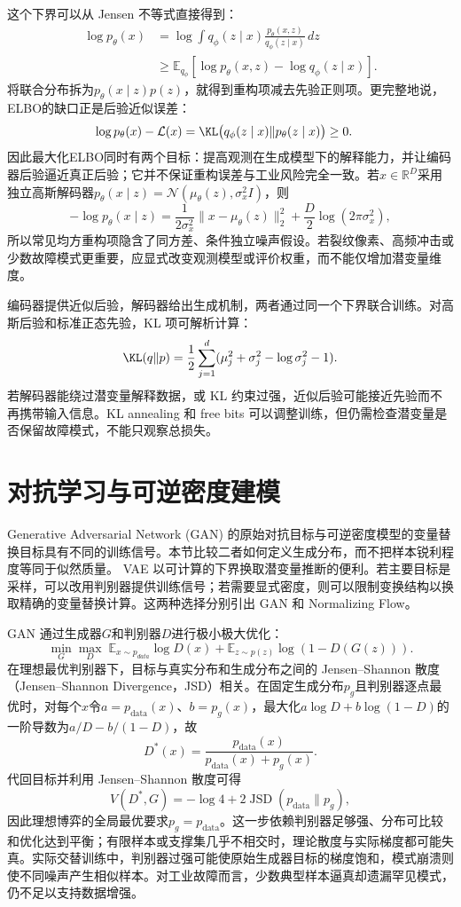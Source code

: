 这个下界可以从 Jensen 不等式直接得到：
\begin{align}
 \log p_\theta(x)
 &=\log\int q_\phi(z\mid x)\frac{p_\theta(x,z)}{q_\phi(z\mid x)}\,dz\\
 &\geq\mathbb E_{q_\phi}[\log p_\theta(x,z)-\log q_\phi(z\mid x)].
\end{align}
将联合分布拆为$p_\theta(x\mid z)p(z)$，就得到重构项减去先验正则项。更完整地说，ELBO的缺口正是后验近似误差：
\begin{align}
\log p_\theta(x)-\mathcal L(x)
&=\KL\bigl(q_\phi(z\mid x)\|p_\theta(z\mid x)\bigr)\geq0.
\end{align}
因此最大化ELBO同时有两个目标：提高观测在生成模型下的解释能力，并让编码器后验逼近真正后验；它并不保证重构误差与工业风险完全一致。若$x\in\mathbb R^D$采用独立高斯解码器$p_\theta(x\mid z)=\mathcal N(\mu_\theta(z),\sigma_x^2I)$，则
\[
-\log p_\theta(x\mid z)=\frac{1}{2\sigma_x^2}\|x-\mu_\theta(z)\|_2^2+\frac D2\log(2\pi\sigma_x^2),
\]
所以常见均方重构项隐含了同方差、条件独立噪声假设。若裂纹像素、高频冲击或少数故障模式更重要，应显式改变观测模型或评价权重，而不能仅增加潜变量维度。

编码器提供近似后验，解码器给出生成机制，两者通过同一个下界联合训练。对高斯后验和标准正态先验，KL 项可解析计算：
\begin{equation}
 \KL(q\|p)=\frac12\sum_{j=1}^{d}(\mu_j^2+\sigma_j^2-\log\sigma_j^2-1).
\end{equation}
若解码器能绕过潜变量解释数据，或 KL 约束过强，近似后验可能接近先验而不再携带输入信息。KL annealing 和 free bits 可以调整训练，但仍需检查潜变量是否保留故障模式，不能只观察总损失。

\section{对抗学习与可逆密度建模}
Generative Adversarial Network (GAN) 的原始对抗目标与可逆密度模型的变量替换目标具有不同的训练信号\cite{goodfellow2014gan,dinh2017realnvp}。本节比较二者如何定义生成分布，而不把样本锐利程度等同于似然质量。
VAE 以可计算的下界换取潜变量推断的便利。若主要目标是采样，可以改用判别器提供训练信号；若需要显式密度，则可以限制变换结构以换取精确的变量替换计算。这两种选择分别引出 GAN 和 Normalizing Flow。

GAN 通过生成器$G$和判别器$D$进行极小极大优化：
\begin{equation}
 \min_G\max_D\;\mathbb{E}_{x\sim p_{data}}\log D(x)+\mathbb{E}_{z\sim p(z)}\log(1-D(G(z))).
\end{equation}
在理想最优判别器下，目标与真实分布和生成分布之间的 Jensen--Shannon 散度（Jensen--Shannon Divergence，JSD）相关。在固定生成分布$p_g$且判别器逐点最优时，对每个$x$令$a=p_{\mathrm{data}}(x)$、$b=p_g(x)$，最大化$a\log D+b\log(1-D)$的一阶导数为$a/D-b/(1-D)$，故
\[
D^*(x)=\frac{p_{\mathrm{data}}(x)}{p_{\mathrm{data}}(x)+p_g(x)}.
\]
代回目标并利用 Jensen--Shannon 散度可得
\[
V(D^*,G)=-\log4+2\operatorname{JSD}(p_{\mathrm{data}}\|p_g),
\]
因此理想博弈的全局最优要求$p_g=p_{\mathrm{data}}$。这一步依赖判别器足够强、分布可比较和优化达到平衡；有限样本或支撑集几乎不相交时，理论散度与实际梯度都可能失真。实际交替训练中，判别器过强可能使原始生成器目标的梯度饱和，模式崩溃则使不同噪声产生相似样本。对工业故障而言，少数典型样本逼真却遗漏罕见模式，仍不足以支持数据增强。

